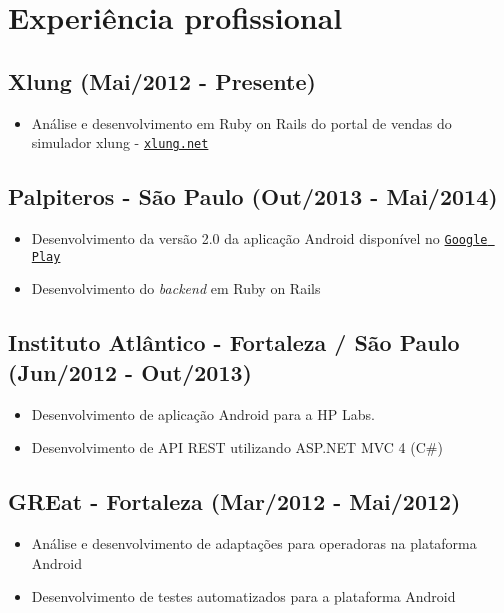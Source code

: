 \documentclass[11pt]{article}
\begin{document}
\section*{Experiência profissional}
{\addtolength{\leftskip}{3.5mm}

\subsection*{Xlung (Mai/2012 - Presente)}
\begin{itemize}
\item Análise e desenvolvimento em Ruby on Rails do portal de vendas do simulador xlung - \href{http://xlung.net}{\tt xlung.net}
\end{itemize}

\subsection*{Palpiteros - São Paulo (Out/2013 - Mai/2014)}
\begin{itemize}
\item Desenvolvimento da versão 2.0 da aplicação Android disponível no \href{https://play.google.com/store/apps/details?id=com.blissapplications.palpiteros}{\tt Google Play}
\item Desenvolvimento do \textit{backend} em Ruby on Rails
\end{itemize}

\subsection*{Instituto Atlântico - Fortaleza / São Paulo (Jun/2012 - Out/2013)}
\begin{itemize}
\item Desenvolvimento de aplicação Android para a HP Labs.
\item Desenvolvimento de API REST utilizando ASP.NET MVC 4 (C\#)
\end{itemize}

\subsection*{GREat - Fortaleza (Mar/2012 - Mai/2012)}
\begin{itemize}
\item Análise e desenvolvimento de adaptações para operadoras na plataforma Android
\item Desenvolvimento de testes automatizados para a plataforma Android
\end{itemize}

}
\end{document}
